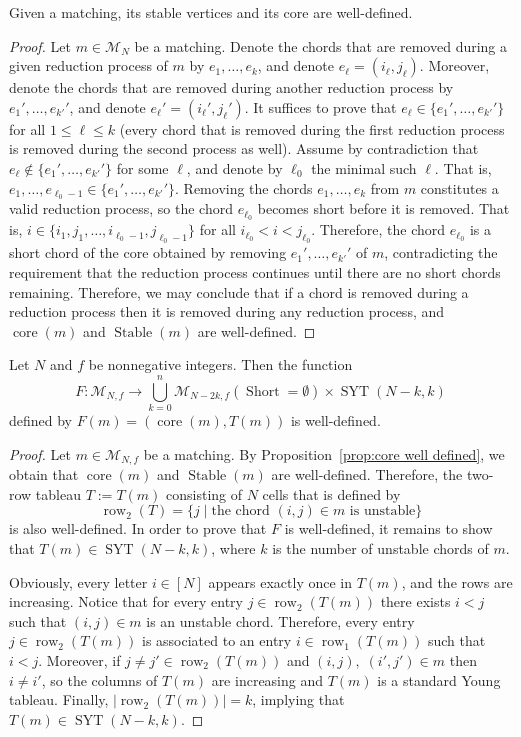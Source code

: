\documentclass[ALCO]{cedram}
\newcommand{\Syt}{\operatorname{SYT}}
\newcommand{\Short}{\operatorname{Short}}
\newcommand{\Stable}{\operatorname{Stable}}
\newcommand{\core}{\operatorname{core}}
\newcommand{\row}{\operatorname{row}}
\newcommand{\M}{\mathcal{M}}
\begin{document}
\begin{proposition}
\label{prop:core well defined}
    Given a matching, its stable vertices and its core are well-defined.
\end{proposition}
\begin{proof}
    Let $m \in \M_N$ be a matching. Denote the chords that are removed during a given reduction process of $m$ by $e_1, \dots, e_k$, and denote $e_\ell = (i_\ell,j_\ell)$. Moreover, denote the chords that are removed during another reduction process by $e_1', \dots, e_{k'}'$, and denote $e_\ell' = (i_\ell',j_\ell')$. It suffices to prove that $e_\ell \in \{e_1', \dots, e_{k'}'\}$ for all $1 \le \ell \le k$ (\ie every chord that is removed during the first reduction process is removed during the second process as well). Assume by contradiction that $e_\ell \notin \{e_1', \dots, e_{k'}'\}$ for some $\ell$, and denote by $\ell_0$ the minimal such $\ell$.
    That is, $e_1,\dots,e_{\ell_0-1} \in \{e_1', \dots, e_{k'}'\}$. Removing the chords $e_1, \dots, e_k$ from $m$ constitutes a valid reduction process, so the chord $e_{\ell_0}$ becomes short before it is removed. That is, $i \in \{i_1,j_1,\dots,i_{\ell_0-1},j_{\ell_0-1}\}$ for all $i_{\ell_0} < i < j_{\ell_0}$. Therefore, the chord $e_{\ell_0}$ is a short chord of the core obtained by removing $e_1', \dots, e_{k'}'$ of $m$, contradicting the requirement that the reduction process continues until there are no short chords remaining. Therefore, we may conclude that if a chord is removed during a reduction process then it is removed during any reduction process, and $\core(m)$ and $\Stable(m)$ are well-defined.
\end{proof}
\begin{corollary}
    Let $N$ and $f$ be nonnegative integers. Then the function
    \[
        F:\M_{N,f} \to \bigcup_{k=0}^n \M_{N-2k,f}(\Short = \emptyset) \times \Syt(N-k,k)
    \]
    defined by $F(m) = (\core(m),T(m))$ is well-defined.
\end{corollary}
\begin{proof}
    Let $m\in \M_{N,f}$ be a matching. By Proposition~\ref{prop:core well defined}, we obtain that $\core(m)$ and $\Stable(m)$ are well-defined. Therefore, the two-row tableau $T:=T(m)$ consisting of $N$ cells that is defined by
    \[
        \row_2(T) = \{j \mid \text{the chord } (i,j) \in m \text{ is unstable}\}
    \]
    is also well-defined. In order to prove that $F$ is well-defined, it remains to show that $T(m) \in \Syt(N-k,k)$, where $k$ is the number of unstable chords of $m$.

    Obviously, every letter $i \in [N]$ appears exactly once in $T(m)$, and the rows are increasing. Notice that for every entry $j \in \row_2(T(m))$ there exists $i<j$ such that $(i,j) \in m$ is an unstable chord. Therefore, every entry $j \in \row_2(T(m))$ is associated to an entry $i \in \row_1(T(m))$ such that $i<j$. Moreover, if $j\ne j' \in \row_2(T(m))$ and $(i,j),\; (i',j') \in m$ then $i \ne i'$, so the columns of $T(m)$ are increasing and $T(m)$ is a standard Young tableau. Finally, $|\row_2(T(m))| = k$, implying that $T(m) \in \Syt(N-k,k)$.
\end{proof}
\end{document}
